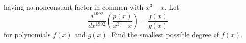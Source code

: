 having no nonconstant factor in common with $x^3 - x$. Let
\[
\frac{d^{1992}}{dx^{1992}} \left( \frac{p(x)}{x^3 - x} \right) =
\frac{f(x)}{g(x)}
\]
for polynomials $f(x)$ and $g(x)$. Find the smallest possible degree of $f(x)$.
